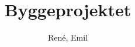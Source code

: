 \documentclass[a4paper,11pt]{article}
\title{Byggeprojektet}
\author{René, Emil}
\begin{document}
\maketitle

\begin{sketch}


\end{sketch}
\end{document}
